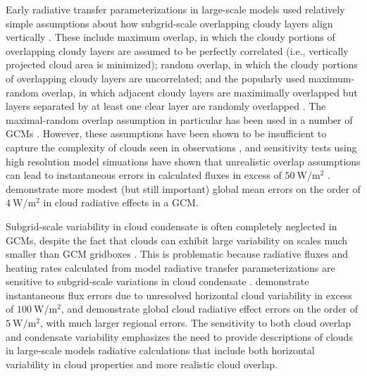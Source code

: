 \documentclass[letter]{article}
\begin{document}
Early radiative transfer parameterizations in large-scale models used relatively simple assumptions about how subgrid-scale overlapping cloudy layers align vertically \citep[e.g.,][]{collins_2001}. These include maximum overlap, in which the cloudy portions of overlapping cloudy layers are assumed to be perfectly correlated (i.e., vertically projected cloud area is minimized); random overlap, in which the cloudy portions of overlapping cloudy layers are uncorrelated; and the popularly used maximum-random overlap, in which adjacent cloudy layers are maximimally overlapped but layers separated by at least one clear layer are randomly overlapped \citep{geleyn_and_hollingsworth_1979}. The maximal-random overlap assumption in particular has been used in a number of GCMs \citep[e.g.,][]{cam3_description,cam4_description,cam5_description}. However, these assumptions have been shown to be insufficient to capture the complexity of clouds seen in observations \citep[e.g.,][]{hogan_and_illingworth_2000,mace_and_benson-troth_2002,barker_2008}, and sensitivity tests using high resolution model simuations have shown that unrealistic overlap assumptions can lead to instantaneous errors in calculated fluxes in excess of $50 ~\text{W}/\text{m}^2$ \citep{barker_et_al_1999,wu_and_liang_2005}. \cite{oreopoulos_et_al_2012} demonstrate more modest (but still important) global mean errors on the order of $4 ~\text{W}/\text{m}^2$ in cloud radiative effects in a GCM.

Subgrid-scale variability in cloud condensate is often completely neglected in GCMs, despite the fact that clouds can exhibit large variability on scales much smaller than GCM gridboxes \citep[e.g.,][]{stephens_and_platt_1987}. This is problematic because radiative fluxes and heating rates calculated from model radiative transfer parameterizations are sensitive to subgrid-scale variations in cloud condensate \citep[e.g.,][]{barker_et_al_1999,wu_and_liang_2005,oreopoulos_et_al_2012}. \cite{barker_et_al_1999} demonstrate instantaneous flux errors due to unresolved horizontal cloud variability in excess of $100 ~\text{W}/\text{m}^2$, and \cite{oreopoulos_et_al_2012} demonstrate global cloud radiative effect errors on the order of $5 ~\text{W}/\text{m}^2$, with much larger regional errors. The sensitivity to both cloud overlap and condensate variability emphasizes the need to provide descriptions of clouds in large-scale models radiative calculations that include both horizontal variability in cloud properties and more realistic cloud overlap.
\end{document}
